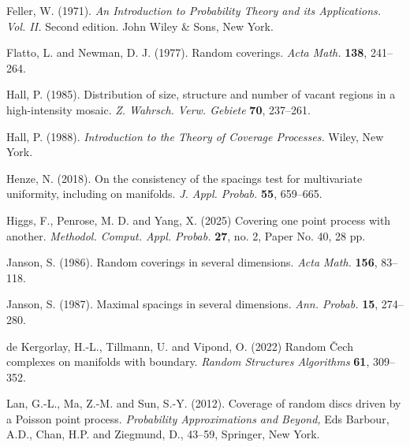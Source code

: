 \documentclass[12pt]{article}
\begin{document}
\begin{thebibliography}{}

Feller, W. (1971).
{\em An Introduction to Probability Theory and its Applications. Vol. II.}
Second edition.
John Wiley \& Sons, 
 New York.


Flatto, L. and Newman, D. J.  (1977).
Random coverings.  {\em Acta Math.} {\bf 138}, 241--264. 

Hall, P.  (1985).
Distribution of size, structure and number of vacant regions in a high-intensity mosaic.
{\em Z. Wahrsch. Verw. Gebiete} {\bf 70}, 237--261. 


Hall, P. (1988).
{\em Introduction to the Theory of Coverage Processes.}
  Wiley, New York.

Henze, N. (2018).
On the consistency of the spacings test for multivariate uniformity,
 including on manifolds.
{\em J. Appl. Probab.} {\bf 55}, 659--665. 

 Higgs, F., Penrose, M. D. and  Yang, X.  (2025)
Covering one point process with another.
{\em Methodol. Comput. Appl. Probab.} {\bf 27}, no. 2, Paper No. 40, 28 pp.

Janson, S.  (1986).
Random coverings in several dimensions.
{\em Acta Math.} {\bf 156},
 83--118. 

Janson, S. (1987).
Maximal spacings in several dimensions.
{\em Ann. Probab.} {\bf 15}, 274--280. 

	de Kergorlay, H.-L., Tillmann, U. and Vipond, O. (2022)
        Random \v{C}ech complexes on manifolds with boundary.
	{\em Random Structures Algorithms} {\bf 61}, %
	309--352.


Lan, G.-L., Ma, Z.-M. and Sun, S.-Y. (2012).
 Coverage of random discs driven by a Poisson point process.
{\em Probability Approximations and Beyond,} Eds
Barbour, A.D., Chan, H.P. and Ziegmund, D., 43--59,
 Springer, New York. 



\end{thebibliography}
\end{document}

